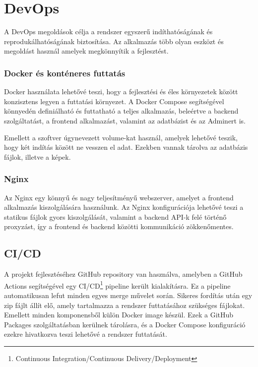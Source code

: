 \section{DevOps}\label{sec:devops}

A DevOps megoldások célja a rendszer egyszerű indíthatóságának és reprodukálhatóságának biztosítása. Az alkalmazás több olyan eszközt és megoldást használ amelyek megkönnyítik a fejlesztést.

\subsubsection{Docker és konténeres futtatás}

Docker használata lehetővé teszi, hogy a fejlesztési és éles környezetek között konzisztens legyen a futtatási környezet. A Docker Compose segítségével könnyedén definiálható és futtatható a teljes alkalmazás, beleértve a backend szolgáltatást, a frontend alkalmazást, valamint az adatbázist és az Adminert is.

Emellett a szoftver úgynevezett volume-kat használ, amelyek lehetővé teszik, hogy két indítás között ne vesszen el adat. Ezekben vannak tárolva az adatbázis fájlok, illetve a képek.

\subsubsection{Nginx}

Az Nginx egy könnyű és nagy teljesítményű webszerver, amelyet a frontend alkalmazás kiszolgálására használunk. Az Nginx konfigurációja lehetővé teszi a statikus fájlok gyors kiszolgálását, valamint a backend API-k felé történő proxyzást, így a frontend és backend közötti kommunikáció zökkenőmentes.

\subsection{CI/CD}

A projekt fejlesztéséhez GitHub repository van használva, amelyben a GitHub Actions segítségével egy CI/CD\footnote{Continuous Integration/Continuous Delivery/Deployment} pipeline került kialakításra. Ez a pipeline automatikusan lefut minden egyes merge művelet során. Sikeres fordítás után egy zip fájlt állít elő, amely tartalmazza a rendszer futtatásához szükséges fájlokat. Emellett minden komponensből külön Docker image készül. Ezek a GitHub Packages szolgáltatásban kerülnek tárolásra, és a Docker Compose konfiguráció ezekre hivatkozva teszi lehetővé a rendszer futtatását.